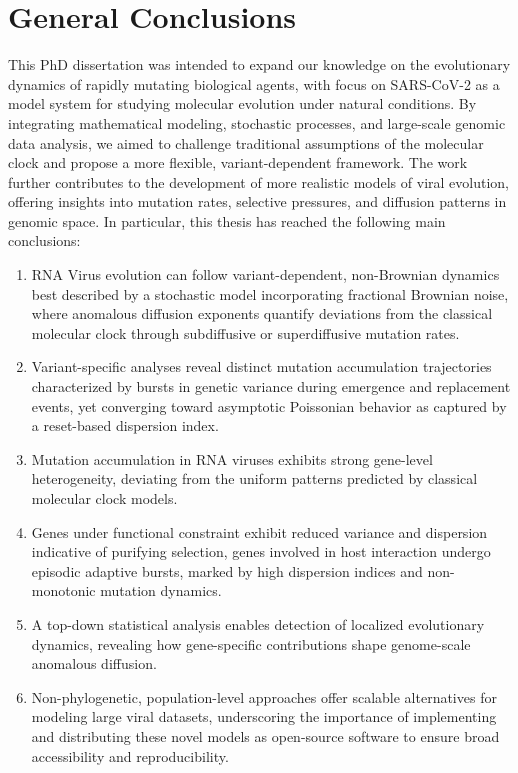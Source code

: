 \chapter{General Conclusions}

This PhD dissertation was intended to expand our knowledge on the evolutionary dynamics of rapidly mutating biological agents, with focus on SARS-CoV-2 as a model system for studying molecular evolution under natural conditions. By integrating mathematical modeling, stochastic processes, and large-scale genomic data analysis, we aimed to challenge traditional assumptions of the molecular clock and propose a more flexible, variant-dependent framework. The work further contributes to the development of more realistic models of viral evolution, offering insights into mutation rates, selective pressures, and diffusion patterns in genomic space. In particular, this thesis has reached the following main conclusions:

\begin{enumerate}
    \item RNA Virus evolution can follow variant-dependent, non-Brownian dynamics best described by a stochastic model incorporating fractional Brownian noise, where anomalous diffusion exponents quantify deviations from the classical molecular clock through subdiffusive or superdiffusive mutation rates.
    \item Variant-specific analyses reveal distinct mutation accumulation trajectories characterized by bursts in genetic variance during emergence and replacement events, yet converging toward asymptotic Poissonian behavior as captured by a reset-based dispersion index.
    \item Mutation accumulation in RNA viruses exhibits strong gene-level heterogeneity, deviating from the uniform patterns predicted by classical molecular clock models.
    \item Genes under functional constraint exhibit reduced variance and dispersion indicative of purifying selection, genes involved in host interaction undergo episodic adaptive bursts, marked by high dispersion indices and non-monotonic mutation dynamics.
    \item A top-down statistical analysis enables detection of localized evolutionary dynamics, revealing how gene-specific contributions shape genome-scale anomalous diffusion.
    \item Non-phylogenetic, population-level approaches offer scalable alternatives for modeling large viral datasets, underscoring the importance of implementing and distributing these novel models as open-source software to ensure broad accessibility and reproducibility.
\end{enumerate}

